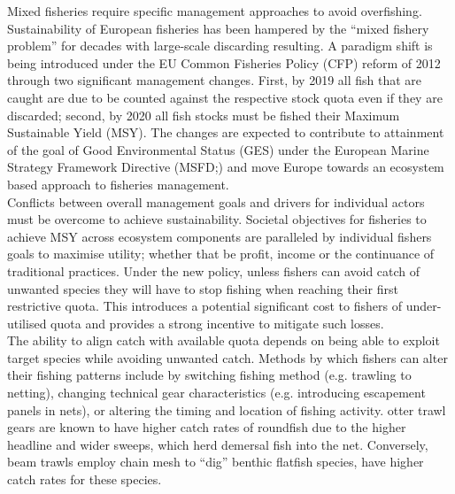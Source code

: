 \documentclass[fleqn,10pt]{wlscirep}
\begin{document}
\begin{linenumbers}
Mixed fisheries require specific management approaches to avoid overfishing.
Sustainability of European fisheries has been hampered by the ``mixed fishery
problem'' for decades with large-scale discarding resulting\cite{Borges2015,
	Uhlmann2014}.  A paradigm shift is being introduced under the EU Common
Fisheries Policy (CFP) reform of 2012 through two significant management
changes.  First, by 2019 all fish that are caught are due to be counted against
the respective stock quota even if they are discarded; second, by 2020 all fish
stocks must be fished 
 their Maximum Sustainable Yield
(MSY)\cite{EuropeanParliamentandCounciloftheEuropeanUnion2013}. The changes are
expected to contribute to attainment of the goal of Good Environmental Status
(GES) under the European Marine Strategy Framework Directive
(MSFD;\cite{EuropeanParliament2008}) and move Europe towards an ecosystem based
approach to fisheries management\cite{Garcia2003}. \\

Conflicts between overall management goals and drivers for individual actors
must be overcome to achieve sustainability. Societal objectives for fisheries
to achieve MSY across ecosystem components are paralleled by individual fishers
goals to maximise utility; whether that be profit, income or the continuance of
traditional practices.  Under the new policy,
unless fishers can avoid catch of unwanted species they will have to stop
fishing when reaching their first restrictive quota. This introduces a
potential significant cost to fishers of under-utilised quota\cite{Hoff2010a,
	Ulrich2016} and provides a strong incentive to mitigate such
losses\cite{Condie2013, Condie2013a}. \\

The ability to align catch with available quota depends on being able to
exploit target species while avoiding unwanted catch. Methods by which fishers
can alter their fishing patterns include by switching fishing method (e.g.
trawling to netting), changing technical gear characteristics (e.g.
introducing escapement panels in nets), or altering the timing and location of
fishing activity\cite{Fulton2011b, vanPutten2012a}.   otter trawl gears are known to have higher catch rates of
roundfish due to the higher headline and wider sweeps, which herd demersal fish
into the net.  Conversely, beam trawls employ chain mesh to ``dig''
benthic flatfish species, have higher catch rates for these
species\cite{Fraser2008}.  \\


\end{linenumbers}
\end{document}
